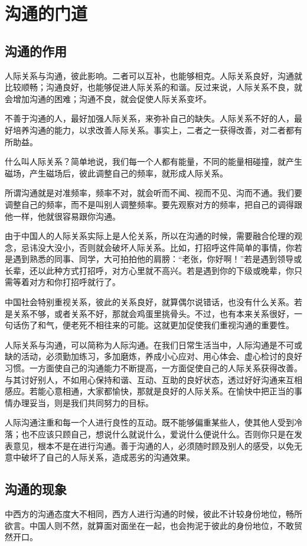 \documentclass[fontset=fandol, a4paper, 12pt, openright]{ctexbook}
\begin{document}
\part{沟通的门道}

\chapter{沟通的作用}
人际关系与沟通，彼此影响。二者可以互补，也能够相克。人际关系良好，沟通就比较顺畅；沟通良好，也能够促进人际关系的和谐。反过来说，人际关系不良，就会增加沟通的困难；沟通不良，就会促使人际关系变坏。

不善于沟通的人，最好加强人际关系，来弥补自己的缺失。人际关系不好的人，最好培养沟通的能力，以求改善人际关系。事实上，二者之一获得改善，对二者都有所助益。

什么叫人际关系？简单地说，我们每一个人都有能量，不同的能量相碰撞，就产生磁场，产生磁场后，彼此调整自己的频率，就形成人际关系。

所谓沟通就是对准频率，频率不对，就会听而不闻、视而不见、沟而不通。我们要调整自己的频率，而不是叫别人调整频率。要先观察对方的频率，把自己的调得跟他一样，他就很容易跟你沟通。

由于中国人的人际关系实际上是人伦关系，所以在沟通的时候，需要融合伦理的观念，忌讳没大没小，否则就会破坏人际关系。比如，打招呼这件简单的事情，你若是遇到熟悉的同事、同学，大可拍拍他的肩膀：“老张，你好啊！”若是遇到领导或长辈，还以此种方式打招呼，对方心里就不高兴。若是遇到你的下级或晚辈，你只需等着对方和你打招呼就行了。

中国社会特别重视关系，彼此的关系良好，就算偶尔说错话，也没有什么关系。若是关系不够，或者关系不好，那就会鸡蛋里挑骨头。不过，也有本来关系很好，一句话伤了和气，便老死不相往来的可能。这就更加促使我们重视沟通的重要性。

人际关系与沟通，可以简称为人际沟通。在我们日常生活当中，人际沟通是不可或缺的活动，必须勤加练习，多加磨炼，养成小心应对、用心体会、虚心检讨的良好习惯。一方面使自己的沟通能力不断提高，一方面促使自己的人际关系获得改善。与其讨好别人，不如用心保持和谐、互动、互助的良好状态，透过好好沟通来互相感应。若能心意相通，大家都愉快，那就是良好的人际关系。在愉快中把正当的事情办理妥当，则是我们共同努力的目标。

人际沟通注重和每一个人进行良性的互动。既不能够偏重某些人，使其他人受到冷落；也不应该只顾自己，想说什么就说什么，爱说什么便说什么。否则你只是在发表意见，根本不是在进行沟通。善于沟通的人，必须随时顾及别人的感受，以免无意中破坏了自己的人际关系，造成恶劣的沟通效果。


\chapter{沟通的现象}
中西方的沟通态度大不相同，西方人进行沟通的时候，彼此不计较身份地位，畅所欲言。中国人则不然，就算面对面坐在一起，也会拘泥于彼此的身份地位，不敢贸然开口。
\end{document}
